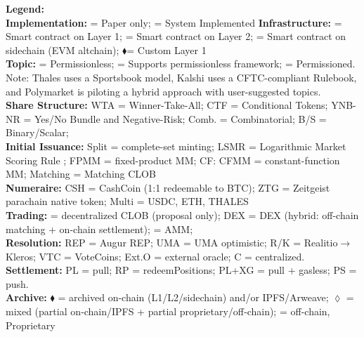 \begin{table}[t!]
{\begin{tabular}{|l|c|c|c|c|c|c|c|c|c|c|c|}
\end{tabular}
}

\vspace{0.30em}
\begin{minipage}{\textwidth}
\textbf{Legend:} \\
\textbf{Implementation:} \Circle = Paper only; \CIRCLE = System Implemented
\textbf{Infrastructure:} \Circle = Smart contract on Layer 1; \LEFTcircle = Smart  contract on Layer 2; \CIRCLE = Smart contract on sidechain (EVM altchain); $\blacklozenge$= Custom Layer 1\\
\textbf{Topic:} \CIRCLE = Permissionless; \LEFTcircle = Supports permissionless framework; \Circle = Permissioned. Note: Thales uses a Sportsbook model, Kalshi uses a CFTC-compliant Rulebook, and Polymarket is piloting a hybrid approach with user-suggested topics.\\
\textbf{Share Structure:} WTA = Winner-Take-All; CTF = Conditional Tokens; YNB-NR = Yes/No Bundle and Negative-Risk; Comb. = Combinatorial; B/S = Binary/Scalar; \\
\textbf{Initial Issuance:} Split = complete-set minting; LSMR = Logarithmic Market Scoring Rule ; FPMM = fixed-product MM; CF: CFMM = constant-function MM; Matching = Matching CLOB \\
\textbf{Numeraire:} CSH = CashCoin (1:1 redeemable to BTC); ZTG = Zeitgeist parachain native token; Multi = USDC, ETH, THALES \\
\textbf{Trading:} \CIRCLE = decentralized CLOB (proposal only); DEX =  DEX (hybrid: off-chain matching + on-chain settlement); \Circle = AMM;  \\
\textbf{Resolution:} REP = Augur REP; UMA = UMA optimistic; R/K = Realitio$\rightarrow$Kleros; VTC = VoteCoins; Ext.O = external oracle; C = centralized. \\
\textbf{Settlement:} PL = pull; RP = redeemPositions; PL+XG = pull + gasless; PS = push. \\
\textbf{Archive:} $\blacklozenge$ = archived on-chain (L1/L2/sidechain) and/or IPFS/Arweave; $\lozenge$ = mixed (partial on‑chain/IPFS + partial proprietary/off‑chain); \Circle = off-chain, Proprietary\\
\end{minipage}
\end{table} 
